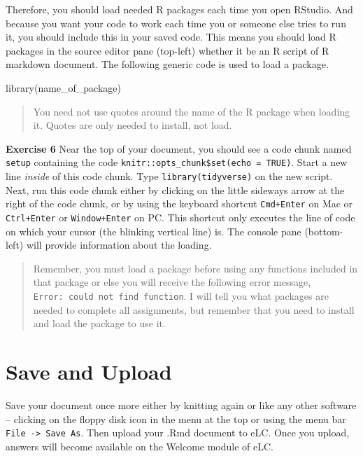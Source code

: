\documentclass[
]{book}
\makeatletter
\newenvironment{Shaded}{\begin{snugshade}}{\end{snugshade}}
\newcommand{\FunctionTok}[1]{\textcolor[rgb]{0,0,0}{#1}}
\newcommand{\NormalTok}[1]{#1}
\newenvironment{kframe}{%
\medskip{}
\setlength{\fboxsep}{.8em}
 \def\at@end@of@kframe{}%
 \ifinner\ifhmode%
  \def\at@end@of@kframe{\end{minipage}}%
  \begin{minipage}{\columnwidth}%
 \fi\fi%
 \def\FrameCommand##1{\hskip\@totalleftmargin \hskip-\fboxsep
 \colorbox{shadecolor}{##1}\hskip-\fboxsep
     \hskip-\linewidth \hskip-\@totalleftmargin \hskip\columnwidth}%
 \MakeFramed {\advance\hsize-\width
   \@totalleftmargin\z@ \linewidth\hsize
   \@setminipage}}%
 {\par\unskip\endMakeFramed%
 \at@end@of@kframe}
\renewenvironment{Shaded}{\begin{kframe}}{\end{kframe}}
\newenvironment{rmdblock}[1]
  {\begin{shaded*}
  }
  {\end{shaded*}
  }
\newenvironment{learncheck}
  {\begin{rmdblock}{warning}}
  {\end{rmdblock}}
\makeatother
\begin{document}
Therefore, you should load needed R packages each time you open RStudio. And because you want your code to work each time you or someone else tries to run it, you should include this in your saved code. This means you should load R packages in the source editor pane (top-left) whether it be an R script of R markdown document. The following generic code is used to load a package.

\begin{Shaded}
\begin{Highlighting}[]
\FunctionTok{library}\NormalTok{(name\_of\_package)}
\end{Highlighting}
\end{Shaded}

\begin{quote}
You need not use quotes around the name of the R package when loading it. Quotes are only needed to install, not load.
\end{quote}

\begin{learncheck}
\textbf{Exercise 6} Near the top of your document, you should see a code
chunk named \texttt{setup} containing the code
\texttt{knitr::opts\_chunk\$set(echo\ =\ TRUE)}. Start a new line
\emph{inside} of this code chunk. Type \texttt{library(tidyverse)} on
the new script. Next, run this code chunk either by clicking on the
little sideways arrow at the right of the code chunk, or by using the
keyboard shortcut \texttt{Cmd+Enter} on Mac or \texttt{Ctrl+Enter} or
\texttt{Window+Enter} on PC. This shortcut only executes the line of
code on which your cursor (the blinking vertical line) is. The console
pane (bottom-left) will provide information about the loading.
\end{learncheck}

\begin{quote}
Remember, you must load a package before using any functions included in that package or else you will receive the following error message, \texttt{Error:\ could\ not\ find\ function}. I will tell you what packages are needed to complete all assignments, but remember that you need to install and load the package to use it.
\end{quote}

\hypertarget{save-and-upload}{%
\section{Save and Upload}\label{save-and-upload}}

Save your document once more either by knitting again or like any other software -- clicking on the floppy disk icon in the menu at the top or using the menu bar \texttt{File\ -\textgreater{}\ Save\ As}. Then upload your .Rmd document to eLC. Once you upload, answers will become available on the Welcome module of eLC.
\end{document}
